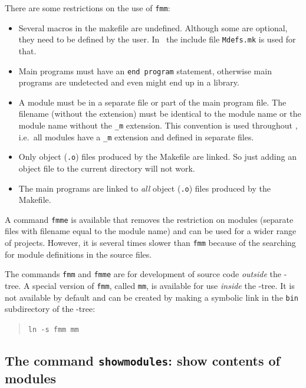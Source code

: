 There are some restrictions on the use of \texttt{fmm}:
\begin{itemize}
   
   \item Several macros in the makefile are undefined. Although some are optional, they need to be defined 
    by the user. In \tfem\ the include file \texttt{Mdefs.mk} is used for that.
   \item Main programs must have an \texttt{end program} statement, otherwise 
      main programs are undetected and even might end up in a library.
   \item A module must be in a separate file or part of the main program file.
     The filename (without the extension) must be identical to the module name
     or the module name without the \texttt{\_m} extension. This
     convention is used throughout \tfem, i.e.\ all modules have a \texttt{\_m}
     extension and defined in separate files.
   \item Only object (\texttt{.o}) files produced by the Makefile are linked.
     So just adding an object file to the current directory will not work.
   \item The main programs are linked to \emph{all} object (\texttt{.o})
     files produced by the Makefile.

\end{itemize}
A command \texttt{fmme} is available that removes the restriction
on modules (separate files with filename equal to the module name) and can be
used for a wider range of projects. However, it is several times slower than
\texttt{fmm} because of the searching for module definitions in the source
files.

The commands \texttt{fmm} and \texttt{fmme} are for development of source code
\emph{outside} the \tfem-tree. A special version of \texttt{fmm}, called
\texttt{mm}, is available for use \emph{inside} the \tfem-tree. It is not
available by default and can be created by making a symbolic link in the
\texttt{bin} subdirectory of the \tfem-tree:
\begin{quote}
   \texttt{ln -s fmm mm}
\end{quote}

\subsection{The command \texttt{showmodules}: show contents of modules}


